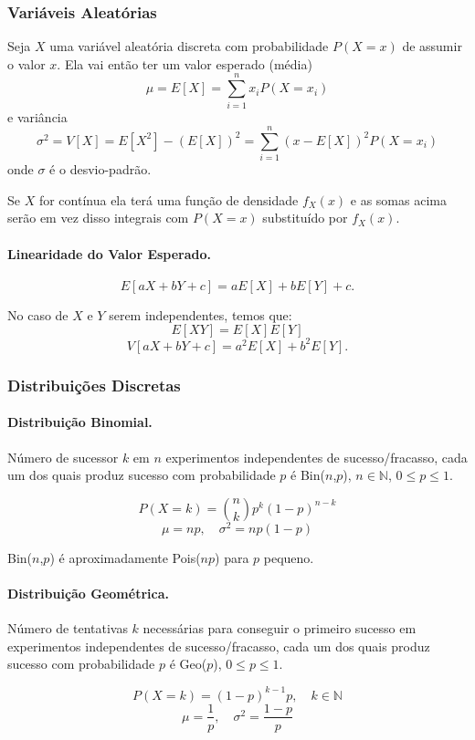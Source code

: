 \subsubsection{Variáveis Aleatórias}
Seja $X$ uma variável aleatória discreta com probabilidade $P(X = x)$ de assumir o valor $x$. Ela vai então ter um valor esperado (média)
$$\mu = E[X] = \sum_{i = 1}^{n} x_iP(X = x_i)$$
e variância
$$\sigma^2 = V[X] = E[X^2] - (E[X])^2 = \sum_{i=1}^{n} (x - E[X])^2P(X=x_i)$$
onde $\sigma$ é o desvio-padrão.

Se $X$ for contínua ela terá uma função de densidade $f_X(x)$ e as somas acima serão em vez disso integrais com $P(X=x)$ substituído por $f_X(x)$.

\paragraph{Linearidade do Valor Esperado.}
$$E[aX + bY + c] = aE[X] + bE[Y] + c.$$

No caso de $X$ e $Y$ serem independentes, temos que:
$$E[XY] = E[X]E[Y]$$
$$V[aX + bY + c] = a^2E[X] + b^2E[Y].$$

\subsubsection{Distribuições Discretas}
\paragraph{Distribuição Binomial.} Número de sucessor $k$ em $n$ experimentos independentes de sucesso/fracasso, cada um dos quais produz sucesso com probabilidade $p$ é Bin($n$,$p$), $n \in \mathbb{N}$, $0 \leq p \leq 1.$

$$P(X = k) = \binom{n}{k}p^k(1-p)^{n-k}$$
$$\mu = np, \quad \sigma^2 = np(1-p)$$

Bin($n$,$p$) é aproximadamente Pois($np$) para $p$ pequeno.

\paragraph{Distribuição Geométrica.} Número de tentativas $k$ necessárias para conseguir o primeiro sucesso em experimentos independentes de sucesso/fracasso, cada um dos quais produz sucesso com probabilidade $p$ é Geo($p$), $0 \leq p \leq 1.$

$$P(X = k) = (1-p)^{k-1}p, \quad k \in \mathbb{N}$$
$$\mu = \frac{1}{p}, \quad \sigma^2 = \frac{1-p}{p}$$

